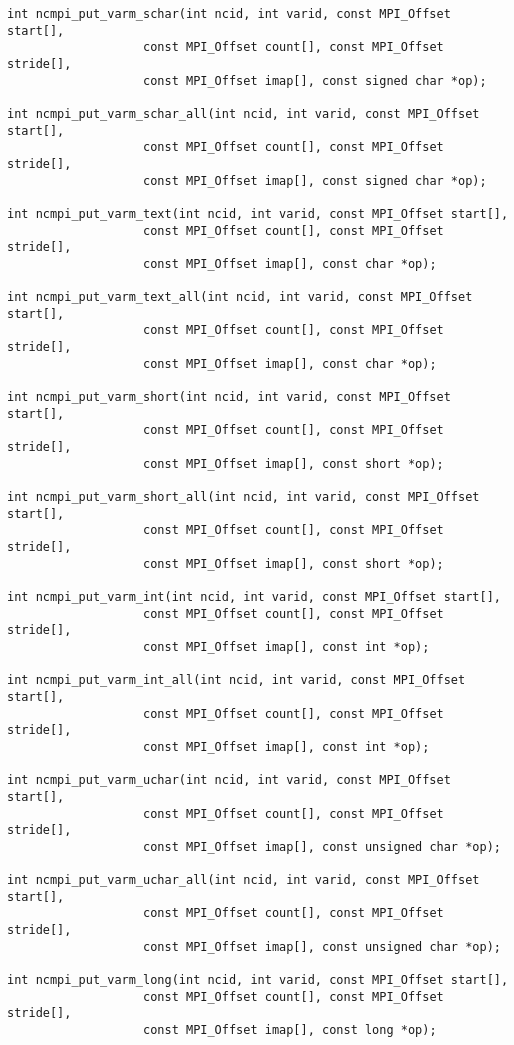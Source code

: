 \begin{verbatim}
int ncmpi_put_varm_schar(int ncid, int varid, const MPI_Offset start[],
                   const MPI_Offset count[], const MPI_Offset stride[],
                   const MPI_Offset imap[], const signed char *op); 

int ncmpi_put_varm_schar_all(int ncid, int varid, const MPI_Offset start[],
                   const MPI_Offset count[], const MPI_Offset stride[],
                   const MPI_Offset imap[], const signed char *op); 

int ncmpi_put_varm_text(int ncid, int varid, const MPI_Offset start[],
                   const MPI_Offset count[], const MPI_Offset stride[],
                   const MPI_Offset imap[], const char *op); 

int ncmpi_put_varm_text_all(int ncid, int varid, const MPI_Offset start[],
                   const MPI_Offset count[], const MPI_Offset stride[],
                   const MPI_Offset imap[], const char *op); 

int ncmpi_put_varm_short(int ncid, int varid, const MPI_Offset start[],
                   const MPI_Offset count[], const MPI_Offset stride[],
                   const MPI_Offset imap[], const short *op); 

int ncmpi_put_varm_short_all(int ncid, int varid, const MPI_Offset start[],
                   const MPI_Offset count[], const MPI_Offset stride[],
                   const MPI_Offset imap[], const short *op); 

int ncmpi_put_varm_int(int ncid, int varid, const MPI_Offset start[],
                   const MPI_Offset count[], const MPI_Offset stride[],
                   const MPI_Offset imap[], const int *op);

int ncmpi_put_varm_int_all(int ncid, int varid, const MPI_Offset start[],
                   const MPI_Offset count[], const MPI_Offset stride[],
                   const MPI_Offset imap[], const int *op); 

int ncmpi_put_varm_uchar(int ncid, int varid, const MPI_Offset start[],
                   const MPI_Offset count[], const MPI_Offset stride[],
                   const MPI_Offset imap[], const unsigned char *op);

int ncmpi_put_varm_uchar_all(int ncid, int varid, const MPI_Offset start[],
                   const MPI_Offset count[], const MPI_Offset stride[],
                   const MPI_Offset imap[], const unsigned char *op); 

int ncmpi_put_varm_long(int ncid, int varid, const MPI_Offset start[],
                   const MPI_Offset count[], const MPI_Offset stride[],
                   const MPI_Offset imap[], const long *op);


\end{verbatim}
